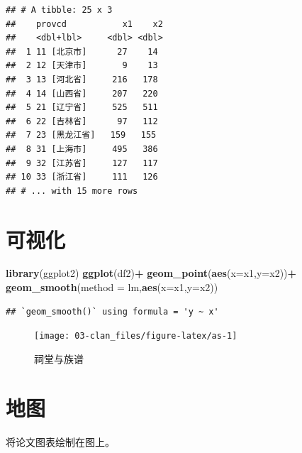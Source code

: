 \documentclass[
  oneside]{book}
\newenvironment{Shaded}{\begin{snugshade}}{\end{snugshade}}
\newcommand{\AttributeTok}[1]{\textcolor[rgb]{0.13,0.29,0.53}{#1}}
\newcommand{\FunctionTok}[1]{\textcolor[rgb]{0.13,0.29,0.53}{\textbf{#1}}}
\newcommand{\NormalTok}[1]{#1}
\newcommand{\SpecialCharTok}[1]{\textcolor[rgb]{0.81,0.36,0.00}{\textbf{#1}}}
\newcommand{\StringTok}[1]{\textcolor[rgb]{0.31,0.60,0.02}{#1}}
\begin{document}
\begin{verbatim}
## # A tibble: 25 x 3
##    provcd           x1    x2
##    <dbl+lbl>     <dbl> <dbl>
##  1 11 [北京市]      27    14
##  2 12 [天津市]       9    13
##  3 13 [河北省]     216   178
##  4 14 [山西省]     207   220
##  5 21 [辽宁省]     525   511
##  6 22 [吉林省]      97   112
##  7 23 [黑龙江省]   159   155
##  8 31 [上海市]     495   386
##  9 32 [江苏省]     127   117
## 10 33 [浙江省]     111   126
## # ... with 15 more rows
\end{verbatim}

\hypertarget{ux53efux89c6ux5316}{%
\section{可视化}\label{ux53efux89c6ux5316}}

\begin{Shaded}
\begin{Highlighting}[]
\FunctionTok{library}\NormalTok{(ggplot2)}
\FunctionTok{ggplot}\NormalTok{(df2)}\SpecialCharTok{+}
  \FunctionTok{geom\_point}\NormalTok{(}\FunctionTok{aes}\NormalTok{(}\AttributeTok{x=}\NormalTok{x1,}\AttributeTok{y=}\NormalTok{x2))}\SpecialCharTok{+}
  \FunctionTok{geom\_smooth}\NormalTok{(}\AttributeTok{method =} \StringTok{\textquotesingle{}lm\textquotesingle{}}\NormalTok{,}\FunctionTok{aes}\NormalTok{(}\AttributeTok{x=}\NormalTok{x1,}\AttributeTok{y=}\NormalTok{x2))}
\end{Highlighting}
\end{Shaded}

\begin{verbatim}
## `geom_smooth()` using formula = 'y ~ x'
\end{verbatim}

\begin{figure}

{\centering \texttt{[image: 03-clan\_files/figure-latex/as-1]} 

}

\caption{祠堂与族谱}\label{fig:as}
\end{figure}

\hypertarget{ux5730ux56fe}{%
\section{地图}\label{ux5730ux56fe}}

将论文图表绘制在图上。
\end{document}
